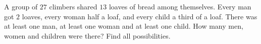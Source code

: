 A group of $27$ climbers shared $13$ loaves of bread among themselves. Every man got $2$ loaves, every woman half a loaf, and every child a third of a loaf. There was at least one man, at least one woman and at least one child. How many men, women and children were there? Find all possibilities.
